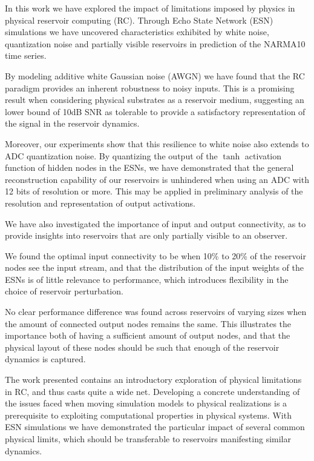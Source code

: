 In this work we have explored the impact of limitations imposed by physics in
physical reservoir computing (RC). Through Echo State Network (ESN) simulations
we have uncovered characteristics exhibited by white noise, quantization noise
and partially visible reservoirs in prediction of the NARMA10 time series.

By modeling additive white Gaussian noise (AWGN) we have found that the RC
paradigm provides an inherent robustness to noisy inputs. This is a promising
result when considering physical substrates as a reservoir medium, suggesting an
lower bound of 10dB SNR as tolerable to provide a satisfactory representation of
the signal in the reservoir dynamics.

Moreover, our experiments show that this resilience to white noise also extends
to ADC quantization noise. By quantizing the output of the $\tanh$ activation
function of hidden nodes in the ESNs, we have demonstrated that the general
reconstruction capability of our reservoirs is unhindered when using an ADC with
12 bits of resolution or more. This may be applied in preliminary analysis of
the resolution and representation of output activations.

We have also investigated the importance of input and output connectivity, as to
provide insights into reservoirs that are only partially visible to an
observer.

We found the optimal input connectivity to be when 10\% to 20\% of the reservoir
nodes see the input stream, and that the distribution of the input weights of
the ESNs is of little relevance to performance, which introduces flexibility in
the choice of reservoir perturbation.

No clear performance difference was found across reservoirs of varying sizes
when the amount of connected output nodes remains the same. This illustrates the
importance both of having a sufficient amount of output nodes, and that the
physical layout of these nodes should be such that enough of the reservoir
dynamics is captured.

The work presented contains an introductory exploration of physical limitations
in RC, and thus casts quite a wide net. Developing a concrete understanding of
the issues faced when moving simulation models to physical realizations is a
prerequisite to exploiting computational properties in physical systems. With
ESN simulations we have demonstrated the particular impact of several common
physical limits, which should be transferable to reservoirs manifesting similar
dynamics.

